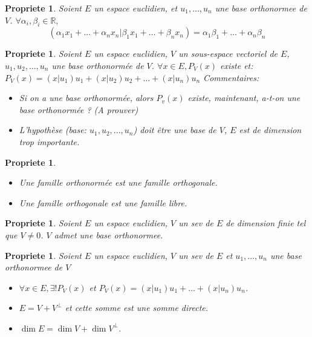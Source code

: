 \documentclass[11pt,a4paper]{article} %
\newtheorem{prop}[defin]{Propriete}
\begin{document}
\begin{prop}
	Soient $E$ un espace euclidien, et $u_1, \ldots, u_n$ une base orthonormee de $V$.
	$\forall \alpha_i, \beta_i \in \mathbb{R},$
	$$(\alpha_1x_1 + \ldots + \alpha_nx_n | \beta_1x_1 + \ldots + \beta_nx_n) = \alpha_1\beta_1 + \ldots + \alpha_n\beta_n$$
\end{prop}

\begin{prop}
  Soient $E$ un espace euclidien, $V$ un sous-espace vectoriel de $E$, $u_1, u_2,..., u_n$ une base orthonormée de $V$.
  $\forall x \in E, P_V(x)$ existe et: $P_V(x) = (x|u_1)u_1 + (x|u_2)u_2 + \ldots + (x|u_n)u_n$
  Commentaires:
  \begin{itemize}
    \item Si on a une base orthonormée, alors $P_v(x)$ existe, maintenant, a-t-on une base orthonormée ? (A prouver)
    \item L'hypothèse (base: $u_1, u_2,..., u_n$) doit être une base de $V$, $E$ est de dimension trop importante.
  \end{itemize}
\end{prop}

\begin{prop}
	\begin{itemize}
		\item Une famille orthonormée est une famille orthogonale.
		\item Une famille orthogonale est une famille libre.
	\end{itemize}
\end{prop}

\begin{prop}
	Soient $E$ un espace euclidien, $V$ un sev de $E$ de dimension finie tel que $V \neq {0}$. $V$ admet une base orthonormee.
\end{prop}

\begin{prop}
	Soient $E$ un espace euclidien, $V$ un sev de $E$ et $u_1, \ldots, u_n$ une base orthonormee de $V$
	\begin{itemize}
		\item $\forall x \in E, \exists! P_V(x)$ et $P_V(x) = (x|u_1)u_1 + \ldots + (x|u_n)u_n$.
		\item $E = V + V^{\perp}$ et cette somme est une somme directe.
		\item $\dim E = \dim V + \dim V^{\perp}$.
	\end{itemize}
\end{prop}
\end{document}
